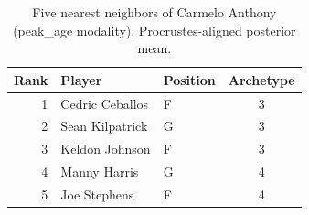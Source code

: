 \begin{table}[htbp]
  \centering\small
  \begin{tabular}{rllc}
    \toprule
    Rank & Player & Position & Archetype \\
    \midrule
    1 & Cedric Ceballos & F & 3 \\
    2 & Sean Kilpatrick & G & 3 \\
    3 & Keldon Johnson & F & 3 \\
    4 & Manny Harris & G & 4 \\
    5 & Joe Stephens & F & 4 \\
    \bottomrule
  \end{tabular}
  \caption{Five nearest neighbors of Carmelo Anthony (peak_age modality), Procrustes-aligned posterior mean.}
  \label{tab:Carmelo_Anthony_neighbors_peak_age}
\end{table}

